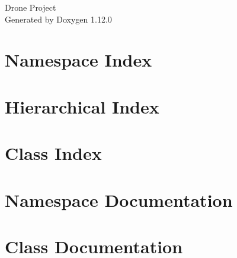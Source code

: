 \documentclass[twoside]{book}
\newcommand{\+}{\discretionary{\mbox{\scriptsize$\hookleftarrow$}}{}{}}
\newcommand{\clearemptydoublepage}{%
    \newpage{\pagestyle{empty}\cleardoublepage}%
  }
\begin{document}
  \raggedbottom
    \hypersetup{pageanchor=false,
                bookmarksnumbered=true,
                pdfencoding=unicode
               }
  \begin{titlepage}
  \vspace*{7cm}
  \begin{center}%
  {\Large Drone Project}\\
  \vspace*{1cm}
  {\large Generated by Doxygen 1.12.0}\\
  \end{center}
  \end{titlepage}
  \clearemptydoublepage
  \tableofcontents
  \clearemptydoublepage
  \hypersetup{pageanchor=true}

\chapter{Namespace Index}

\chapter{Hierarchical Index}

\chapter{Class Index}

\chapter{Namespace Documentation}

\chapter{Class Documentation}












  \backmatter
  \newpage
  \clearemptydoublepage
  \printindex
\end{document}
